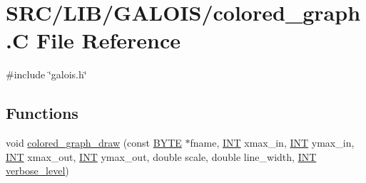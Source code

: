 \hypertarget{_l_i_b_2_g_a_l_o_i_s_2colored__graph_8_c}{}\section{S\+R\+C/\+L\+I\+B/\+G\+A\+L\+O\+I\+S/colored\+\_\+graph.C File Reference}
\label{_l_i_b_2_g_a_l_o_i_s_2colored__graph_8_c}
{\ttfamily \#include \char`\"{}galois.\+h\char`\"{}}\newline
\subsection*{Functions}
\begin{DoxyCompactItemize}
\item 
void \mbox{\hyperlink{_l_i_b_2_g_a_l_o_i_s_2colored__graph_8_c_ae8b578b6d3c09c831d76dd38e866d82a}{colored\+\_\+graph\+\_\+draw}} (const \mbox{\hyperlink{galois_8h_ab6cc7b4aeb6ea31aba2b3fbfc83ff5e6}{B\+Y\+TE}} $\ast$fname, \mbox{\hyperlink{galois_8h_a09fddde158a3a20bd2dcadb609de11dc}{I\+NT}} xmax\+\_\+in, \mbox{\hyperlink{galois_8h_a09fddde158a3a20bd2dcadb609de11dc}{I\+NT}} ymax\+\_\+in, \mbox{\hyperlink{galois_8h_a09fddde158a3a20bd2dcadb609de11dc}{I\+NT}} xmax\+\_\+out, \mbox{\hyperlink{galois_8h_a09fddde158a3a20bd2dcadb609de11dc}{I\+NT}} ymax\+\_\+out, double scale, double line\+\_\+width, \mbox{\hyperlink{galois_8h_a09fddde158a3a20bd2dcadb609de11dc}{I\+NT}} \mbox{\hyperlink{simeon_8_c_a818073fbcc2f439e7c56952f67386122}{verbose\+\_\+level}})
\item 

\end{DoxyCompactItemize}
